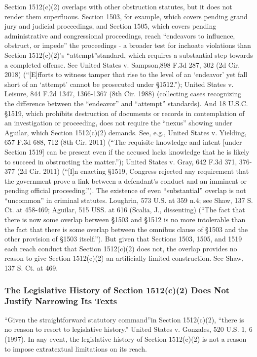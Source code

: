 Section 1512(c)(2) overlaps with other obstruction statutes, but it does not render them superfluous.
Section 1503, for example, which covers pending grand jury and judicial proceedings, and Section 1505, which covers pending administrative and congressional proceedings, reach “endeavors to influence, obstruct, or impede” the proceedings - a broader test for inchoate violations than Section 1512(c)(2)’s “attempt”standard, which requires a substantial step towards a completed offense.
See United States v. Sampson,898 F.3d 287, 302 (2d Cir. 2018) (“[E]fforts to witness tamper that rise to the level of an ‘endeavor’ yet fall short of an ‘attempt’ cannot be prosecuted under \S 1512.”); United States v. Leisure, 844 F.2d 1347, 1366-1367 (8th Cir. 1988) (collecting cases recognizing the difference between the “endeavor” and “attempt” standards). And 18 U.S.C. \S 1519, which prohibits destruction of documents or records in contemplation of an investigation or proceeding, does not require the “nexus” showing under Aguilar, which Section 1512(c)(2) demands.
See, e.g., United States v. Yielding, 657 F.3d 688, 712 (8th Cir. 2011) (“The requisite knowledge and intent [under Section 1519] can be present even if the accused lacks knowledge that he is likely to succeed in obstructing the matter.”); United States v. Gray, 642 F.3d 371, 376-377 (2d Cir. 2011) (“[I]n enacting \S 1519, Congress rejected any requirement that the government prove a link between a defendant’s conduct and an imminent or pending official proceeding.”).
The existence of even “substantial” overlap is not “uncommon” in criminal statutes.
Loughrin, 573 U.S. at 359 n.4;
see Shaw, 137 S. Ct. at 458-469; Aguilar, 515 USS. at 616 (Scalia, J., dissenting) (“The fact that there is now some overlap between \S 1503 and \S 1512 is no more intolerable than the fact that there is some overlap between the omnibus clause of \S 1503 and the other provision of \S 1503 itself.”).
But given that Sections 1503, 1505, and 1519 each reach conduct that Section 1512(c)(2) does not, the overlap provides no reason to give Section 1512(c)(2) an artificially limited construction.
See Shaw, 137 S. Ct. at 469.%

\subsubsection{The Legislative History of Section 1512(c)(2) Does Not Justify Narrowing Its Texts}

“Given the straightforward statutory command”in Section 1512(c)(2), “there is no reason to resort to legislative history.” United States v. Gonzales, 520 U.S. 1, 6 (1997).
In any event, the legislative history of Section 1512(c)(2) is not a reason to impose extratextual limitations on its reach.

